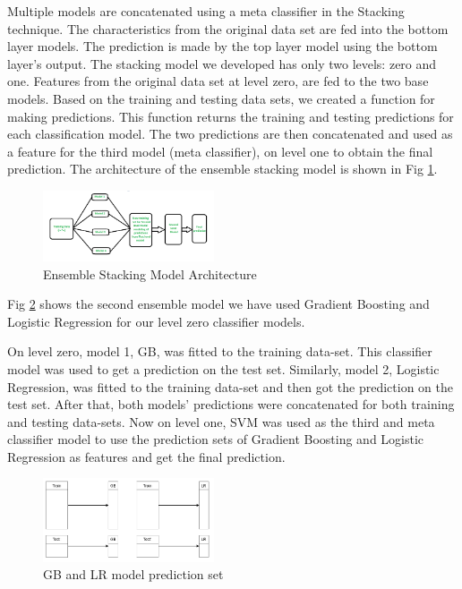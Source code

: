 \documentclass[sigconf, nonacm]{acmart}
\begin{document}
    
Multiple models are concatenated using a meta classifier in the Stacking technique. The characteristics from the original data set are fed into the bottom layer models. The prediction is made by the top layer model using the bottom layer's output. The stacking model we developed has only two levels: zero and one. Features from the original data set at level zero, are fed to the two base models. Based on the training and testing data sets, we created a function for making predictions. This function returns the training and testing predictions for each classification model. The two predictions are then concatenated and used as a feature for the third model (meta classifier), on level one to obtain the final prediction. The architecture of the ensemble stacking model is shown in Fig \ref{fig:ensemble}.
\begin{figure}[h]
	\centering
	\includegraphics[width=0.45\textwidth]{Ensemble/ensemble.PNG}
	\caption{Ensemble Stacking Model Architecture}
	\label{fig:ensemble}
\end{figure}


Fig \ref{fig:gb_lr} shows the second ensemble model we have used Gradient Boosting and Logistic Regression for our level zero classifier models.

On level zero, model 1, GB, was fitted to the training data-set. This classifier model was used to get a prediction on the test set. Similarly, model 2, Logistic Regression, was fitted to the training data-set and then got the prediction on the test set. After that, both models' predictions were concatenated  for both training and testing data-sets. Now on level one, SVM was used as the third and meta classifier model to use the prediction sets of Gradient Boosting and Logistic Regression as features and get the final prediction.

\begin{figure}[h]
	\centering
	\includegraphics[width=0.45\textwidth]{Ensemble/model2.PNG}
	\caption{GB and LR model prediction set}
	\label{fig:gb_lr}
\end{figure}
\end{document}
